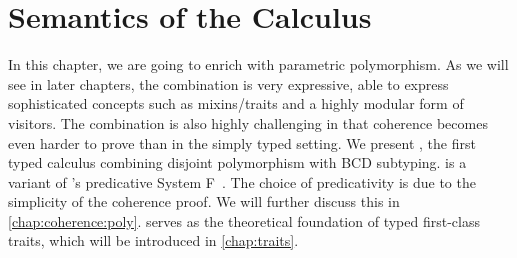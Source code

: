 
\chapter{Semantics of the \fnamee Calculus}
\label{chap:fi}

In this chapter, we are going to enrich \namee with parametric polymorphism. As
we will see in later chapters, the combination is very expressive, able to express sophisticated
concepts such as mixins/traits and a highly modular form of visitors. The
combination is also highly challenging in that coherence becomes even harder to
prove than in the simply typed setting. We present \fnamee, the first typed
calculus combining disjoint polymorphism with BCD subtyping. \fnamee is a
variant of \citeauthor{leivant1991finitely}'s predicative System
F~\citep{leivant1991finitely}. The choice of predicativity is due to the
simplicity of the coherence proof. We will further discuss this in
\cref{chap:coherence:poly}. \fnamee serves as the theoretical foundation of
typed first-class traits, which will be introduced in \cref{chap:traits}.












